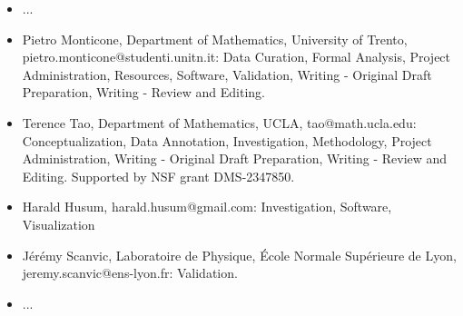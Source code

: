 \begin{itemize}
    \item ...
    \item Pietro Monticone, Department of Mathematics, University of Trento, pietro.monticone@studenti.unitn.it: Data Curation, Formal Analysis, Project Administration, Resources, Software, Validation, Writing - Original Draft Preparation, Writing - Review and Editing.
    \item Terence Tao, Department of Mathematics, UCLA, tao@math.ucla.edu: Conceptualization, Data Annotation, Investigation, Methodology, Project Administration, Writing - Original Draft Preparation, Writing - Review and Editing. Supported by NSF grant DMS-2347850.
    \item Harald Husum, harald.husum@gmail.com: Investigation, Software, Visualization
    \item Jérémy Scanvic, Laboratoire de Physique, École Normale Supérieure de Lyon, jeremy.scanvic@ens-lyon.fr: Validation.
    \item ...
\end{itemize}
